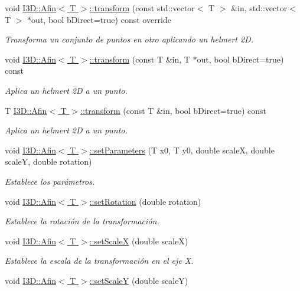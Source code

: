 \begin{DoxyCompactItemize}
void \hyperlink{group__trf2_d_group_gae1b65d232072a70d58ec72492a430521}{I3\+D\+::\+Afin$<$ T $>$\+::transform} (const std\+::vector$<$ T $>$ \&in, std\+::vector$<$ T $>$ $\ast$out, bool b\+Direct=true) const  override
\begin{DoxyCompactList}\small\item\em Transforma un conjunto de puntos en otro aplicando un helmert 2D. \end{DoxyCompactList}\item 
void \hyperlink{group__trf2_d_group_gaf2fb5278c5648034ef5f20c526866b77}{I3\+D\+::\+Afin$<$ T $>$\+::transform} (const T \&in, T $\ast$out, bool b\+Direct=true) const 
\begin{DoxyCompactList}\small\item\em Aplica un helmert 2D a un punto. \end{DoxyCompactList}\item 
T \hyperlink{group__trf2_d_group_ga8c7cfcf7b749b3adc69ebb6cfc0bb412}{I3\+D\+::\+Afin$<$ T $>$\+::transform} (const T \&in, bool b\+Direct=true) const 
\begin{DoxyCompactList}\small\item\em Aplica un helmert 2D a un punto. \end{DoxyCompactList}\item 
void \hyperlink{group__trf2_d_group_gaa6f479027bc96a8d58eaf52925822ecc}{I3\+D\+::\+Afin$<$ T $>$\+::set\+Parameters} (T x0, T y0, double scaleX, double scaleY, double rotation)
\begin{DoxyCompactList}\small\item\em Establece los parámetros. \end{DoxyCompactList}\item 
void \hyperlink{group__trf2_d_group_ga07de5ad4be2f59ff5baa9b293211554d}{I3\+D\+::\+Afin$<$ T $>$\+::set\+Rotation} (double rotation)
\begin{DoxyCompactList}\small\item\em Establece la rotación de la transformación. \end{DoxyCompactList}\item 
void \hyperlink{group__trf2_d_group_ga33b6c90a0d7d957adb192d7768b574a1}{I3\+D\+::\+Afin$<$ T $>$\+::set\+ScaleX} (double scaleX)
\begin{DoxyCompactList}\small\item\em Establece la escala de la transformación en el eje X. \end{DoxyCompactList}\item 
void \hyperlink{group__trf2_d_group_ga2795a27b71c8e6364e71b828e042b6d7}{I3\+D\+::\+Afin$<$ T $>$\+::set\+ScaleY} (double scaleY)

\end{DoxyCompactItemize}
